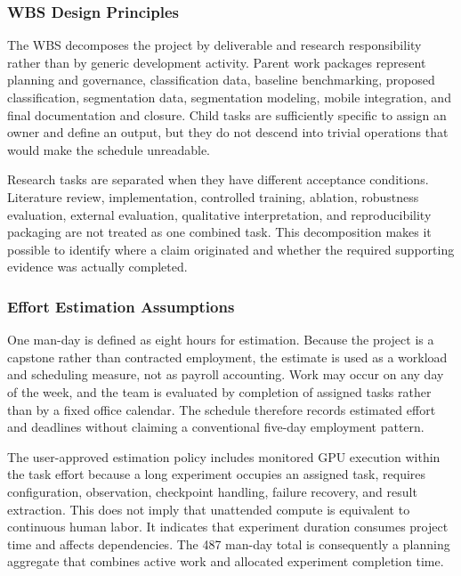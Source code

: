 \documentclass[12pt,a4paper]{report}
\begin{document}
\subsubsection{WBS Design Principles}
The WBS decomposes the project by deliverable and research responsibility rather than by generic development activity. Parent work packages represent planning and governance, classification data, baseline benchmarking, proposed classification, segmentation data, segmentation modeling, mobile integration, and final documentation and closure. Child tasks are sufficiently specific to assign an owner and define an output, but they do not descend into trivial operations that would make the schedule unreadable.\par
Research tasks are separated when they have different acceptance conditions. Literature review, implementation, controlled training, ablation, robustness evaluation, external evaluation, qualitative interpretation, and reproducibility packaging are not treated as one combined task. This decomposition makes it possible to identify where a claim originated and whether the required supporting evidence was actually completed.\par
\subsubsection{Effort Estimation Assumptions}
One man-day is defined as eight hours for estimation. Because the project is a capstone rather than contracted employment, the estimate is used as a workload and scheduling measure, not as payroll accounting. Work may occur on any day of the week, and the team is evaluated by completion of assigned tasks rather than by a fixed office calendar. The schedule therefore records estimated effort and deadlines without claiming a conventional five-day employment pattern.\par
The user-approved estimation policy includes monitored GPU execution within the task effort because a long experiment occupies an assigned task, requires configuration, observation, checkpoint handling, failure recovery, and result extraction. This does not imply that unattended compute is equivalent to continuous human labor. It indicates that experiment duration consumes project time and affects dependencies. The 487 man-day total is consequently a planning aggregate that combines active work and allocated experiment completion time.\par
\end{document}
